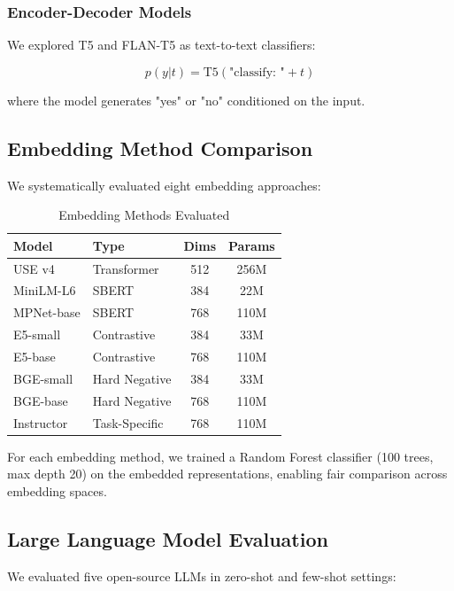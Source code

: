 \documentclass[12pt,a4paper]{article}
\begin{document}
\subsubsection{Encoder-Decoder Models}

We explored T5 \cite{Raffel2020} and FLAN-T5 \cite{Chung2022} as text-to-text classifiers:

\begin{equation}
p(y | t) = \text{T5}(\text{"classify: "} + t)
\end{equation}

where the model generates "yes" or "no" conditioned on the input.

\subsection{Embedding Method Comparison}

We systematically evaluated eight embedding approaches:

\begin{table}[h]
\centering
\caption{Embedding Methods Evaluated}
\begin{tabular}{llcc}
\toprule
\textbf{Model} & \textbf{Type} & \textbf{Dims} & \textbf{Params} \\
\midrule
USE v4 & Transformer & 512 & 256M \\
MiniLM-L6 & SBERT & 384 & 22M \\
MPNet-base & SBERT & 768 & 110M \\
E5-small & Contrastive & 384 & 33M \\
E5-base & Contrastive & 768 & 110M \\
BGE-small & Hard Negative & 384 & 33M \\
BGE-base & Hard Negative & 768 & 110M \\
Instructor & Task-Specific & 768 & 110M \\
\bottomrule
\end{tabular}
\end{table}

For each embedding method, we trained a Random Forest classifier (100 trees, max depth 20) on the embedded representations, enabling fair comparison across embedding spaces.

\subsection{Large Language Model Evaluation}

We evaluated five open-source LLMs in zero-shot and few-shot settings:
\end{document}
